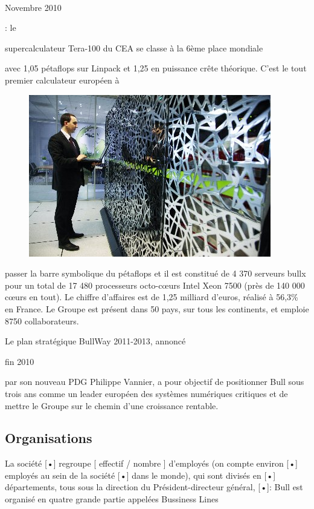 \documentclass{article}
\begin{document}
		\paragraph{}
		\begin{bf}Novembre 2010\end{bf} : le \begin{bf}supercalculateur Tera-100 du CEA se classe à la 6ème place mondiale\end{bf} 
		avec 1,05 pétaflops sur Linpack et 1,25 en puissance crête théorique. C'est le tout premier calculateur européen à 
		\begin{figure}
		\includegraphics{tera_100.jpg}
		\end{figure}
		passer la barre symbolique du pétaflops et il est constitué de 4 370 serveurs bullx pour un total de 17 480 processeurs 
		octo-cœurs Intel Xeon 7500 (près de 140 000 cœurs en tout). Le chiffre d’affaires est de 1,25 milliard d’euros, 
		réalisé à 56,3\% en France. Le Groupe est présent dans 50 pays, sur tous les continents, et emploie 8750 collaborateurs.

		Le plan stratégique BullWay 2011-2013, annoncé \begin{bf}fin 2010\end{bf} par son nouveau PDG Philippe Vannier, a 
		pour objectif de positionner Bull sous trois ans comme un leader européen des systèmes numériques critiques et de 
		mettre le Groupe sur le chemin d’une croissance rentable.
		\subsection{Organisations}
		La société [•] regroupe [ effectif / nombre ] d’employés (on compte environ [•] employés au sein de la société [•] 
		dans le monde), qui sont divisés en [•] départements, tous sous la direction du Président-directeur général, [•]: 
		Bull est organisé en quatre grande partie appelées Bussiness Lines
\end{document}
